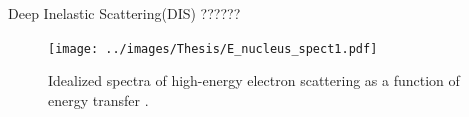 \documentclass[12pt,usenames,dvipsnames]{beamer}
\begin{document}
\begin{frame}
\begin{block}{Deep Inelastic Scattering(DIS) ??????}
\begin{figure}[]
	\centering
	\texttt{[image: ../images/Thesis/E\_nucleus\_spect1.pdf]}
	\vspace{20pt}
	\caption*{ Idealized spectra of high-energy electron scattering as a function of energy transfer \cite{spectrum}.}
	
\end{figure}

\end{block}
\end{frame}
\end{document}
